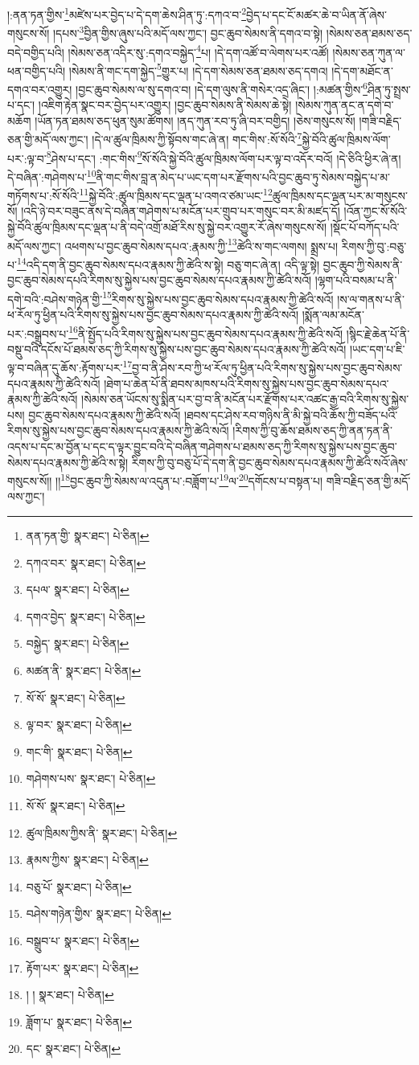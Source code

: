 །:ནན་ཏན་གྱིས་\footnote{ནན་ཏན་གྱི་  སྣར་ཐང་།  པེ་ཅིན། }མཛེས་པར་བྱེད་པ་དེ་དག་ཆེས་ཤིན་ཏུ་:དཀའ་བ་\footnote{དཀའ་བར་  སྣར་ཐང་།  པེ་ཅིན། }བྱེད་པ་དང་ངོ་མཚར་ཆེ་བ་ཡིན་ནོ་ཞེས་གསུངས་སོ། །དཔས་\footnote{དཔལ་  སྣར་ཐང་།  པེ་ཅིན། }བྱིན་གྱིས་ཞུས་པའི་མདོ་ལས་ཀྱང་། བྱང་ཆུབ་སེམས་ནི་དགའ་བ་སྟེ། །སེམས་ཅན་ཐམས་ཅད་བདེ་བགྱིད་པའི། །སེམས་ཅན་འདིར་སུ་:དགའ་བསྐྱེད་\footnote{དགའ་བྱེད་  སྣར་ཐང་།  པེ་ཅིན། }པ། །དེ་དག་འཚོ་བ་ལེགས་པར་འཚོ། །སེམས་ཅན་ཀུན་ལ་ཕན་བགྱིད་པའི། །སེམས་ནི་གང་དག་སྐྱེད་\footnote{བསྐྱེད་  སྣར་ཐང་།  པེ་ཅིན། }གྱུར་པ། །དེ་དག་སེམས་ཅན་ཐམས་ཅད་དགའ། །དེ་དག་མཐོང་ན་དགའ་བར་འགྱུར། །བྱང་ཆུབ་སེམས་ལ་སུ་དགའ་བ། །དེ་དག་ལུས་ནི་གསེར་འདྲ་ཞིང་། །:མཚན་གྱིས་\footnote{མཚན་ནི་  སྣར་ཐང་།  པེ་ཅིན། }ཤིན་ཏུ་སྤྲས་པ་དང་། །འཇིག་རྟེན་སྣང་བར་བྱེད་པར་འགྱུར། །བྱང་ཆུབ་སེམས་ནི་སེམས་ཆེ་སྟེ། །སེམས་ཀུན་ནང་ན་དགེ་བ་མཆོག །ཡོན་ཏན་ཐམས་ཅད་ཕུན་སུམ་ཚོགས། །ནད་ཀུན་རབ་ཏུ་ཞི་བར་བགྱིད། །ཅེས་གསུངས་སོ། །གཟི་བརྗིད་ཅན་གྱི་མདོ་ལས་ཀྱང་། །དེ་ལ་ཚུལ་ཁྲིམས་ཀྱི་སྟོབས་གང་ཞེ་ན། གང་གིས་:སོ་སོའི་\footnote{སོ་སོ་  སྣར་ཐང་།  པེ་ཅིན། }སྐྱེ་བོའི་ཚུལ་ཁྲིམས་ལོག་པར་:ལྟ་བ་\footnote{ལྟ་བར་  སྣར་ཐང་།  པེ་ཅིན། }ཤེས་པ་དང་། :གང་གིས་\footnote{གང་གི་  སྣར་ཐང་།  པེ་ཅིན། }སོ་སོའི་སྐྱེ་བོའི་ཚུལ་ཁྲིམས་ལོག་པར་ལྟ་བ་འདོར་བའོ། །དེ་ཅིའི་ཕྱིར་ཞེ་ན། དེ་བཞིན་:གཤེགས་པ་\footnote{གཤེགས་པས་  སྣར་ཐང་།  པེ་ཅིན། }ནི་གང་གིས་བླ་ན་མེད་པ་ཡང་དག་པར་རྫོགས་པའི་བྱང་ཆུབ་ཏུ་སེམས་བསྐྱེད་པ་མ་གཏོགས་པ་:སོ་སོའི་\footnote{སོ་སོ་  སྣར་ཐང་།  པེ་ཅིན། }སྐྱེ་བོའི་:ཚུལ་ཁྲིམས་དང་ལྡན་པ་འགའ་ཙམ་ཡང་\footnote{ཚུལ་ཁྲིམས་ཀྱིས་ནི་  སྣར་ཐང་།  པེ་ཅིན། }ཚུལ་ཁྲིམས་དང་ལྡན་པར་མ་གསུངས་སོ། །འདི་ཉེ་བར་བཟུང་ནས་དེ་བཞིན་གཤེགས་པ་མངོན་པར་གྲུབ་པར་གསུང་བར་མི་མཛད་དོ། །འོན་ཀྱང་སོ་སོའི་སྐྱེ་བོའི་ཚུལ་ཁྲིམས་དང་ལྡན་པ་ནི་བདེ་འགྲོ་མཐོ་རིས་སུ་སྐྱེ་བར་འགྱུར་རོ་ཞེས་གསུངས་སོ། །སྡོང་པོ་བཀོད་པའི་མདོ་ལས་ཀྱང་། འཕགས་པ་བྱང་ཆུབ་སེམས་དཔའ་:རྣམས་ཀྱི་\footnote{རྣམས་ཀྱིས་  སྣར་ཐང་།  པེ་ཅིན། }ཚེའི་ས་གང་ལགས། སྨྲས་པ། རིགས་ཀྱི་བུ་:བཅུ་པ་\footnote{བཅུ་པོ་  སྣར་ཐང་།  པེ་ཅིན། }འདི་དག་ནི་བྱང་ཆུབ་སེམས་དཔའ་རྣམས་ཀྱི་ཚེའི་ས་སྟེ། བཅུ་གང་ཞེ་ན། འདི་ལྟ་སྟེ། བྱང་ཆུབ་ཀྱི་སེམས་ནི་བྱང་ཆུབ་སེམས་དཔའི་རིགས་སུ་སྐྱེས་པས་བྱང་ཆུབ་སེམས་དཔའ་རྣམས་ཀྱི་ཚེའི་སའོ། །ལྷག་པའི་བསམ་པ་ནི་དགེ་བའི་:བཤེས་གཉེན་གྱི་\footnote{བཤེས་གཉེན་གྱིས་  སྣར་ཐང་།  པེ་ཅིན། }རིགས་སུ་སྐྱེས་པས་བྱང་ཆུབ་སེམས་དཔའ་རྣམས་ཀྱི་ཚེའི་སའོ། །ས་ལ་གནས་པ་ནི་ཕ་རོལ་ཏུ་ཕྱིན་པའི་རིགས་སུ་སྐྱེས་པས་བྱང་ཆུབ་སེམས་དཔའ་རྣམས་ཀྱི་ཚེའི་སའོ། །སྨོན་ལམ་མངོན་པར་:བསྒྲུབས་པ་\footnote{བསྒྲུབ་པ་  སྣར་ཐང་།  པེ་ཅིན། }ནི་སྤྱོད་པའི་རིགས་སུ་སྐྱེས་པས་བྱང་ཆུབ་སེམས་དཔའ་རྣམས་ཀྱི་ཚེའི་སའོ། །སྙིང་རྗེ་ཆེན་པོ་ནི་བསྡུ་བའི་དངོས་པོ་ཐམས་ཅད་ཀྱི་རིགས་སུ་སྐྱེས་པས་བྱང་ཆུབ་སེམས་དཔའ་རྣམས་ཀྱི་ཚེའི་སའོ། །ཡང་དག་པ་ཇི་ལྟ་བ་བཞིན་དུ་ཆོས་:རྟོགས་པར་\footnote{རྟོག་པར་  སྣར་ཐང་།  པེ་ཅིན། }བྱ་བ་ནི་ཤེས་རབ་ཀྱི་ཕ་རོལ་ཏུ་ཕྱིན་པའི་རིགས་སུ་སྐྱེས་པས་བྱང་ཆུབ་སེམས་དཔའ་རྣམས་ཀྱི་ཚེའི་སའོ། །ཐེག་པ་ཆེན་པོ་ནི་ཐབས་མཁས་པའི་རིགས་སུ་སྐྱེས་པས་བྱང་ཆུབ་སེམས་དཔའ་རྣམས་ཀྱི་ཚེའི་སའོ། །སེམས་ཅན་ཡོངས་སུ་སྨིན་པར་བྱ་བ་ནི་མངོན་པར་རྫོགས་པར་འཚང་རྒྱ་བའི་རིགས་སུ་སྐྱེས་པས། བྱང་ཆུབ་སེམས་དཔའ་རྣམས་ཀྱི་ཚེའི་སའོ། །ཐབས་དང་ཤེས་རབ་གཉིས་ནི་མི་སྐྱེ་བའི་ཆོས་ཀྱི་བཟོད་པའི་རིགས་སུ་སྐྱེས་པས་བྱང་ཆུབ་སེམས་དཔའ་རྣམས་ཀྱི་ཚེའི་སའོ། །རིགས་ཀྱི་བུ་ཆོས་ཐམས་ཅད་ཀྱི་ནན་ཏན་ནི་འདས་པ་དང་མ་བྱོན་པ་དང་ད་ལྟར་བྱུང་བའི་དེ་བཞིན་གཤེགས་པ་ཐམས་ཅད་ཀྱི་རིགས་སུ་སྐྱེས་པས་བྱང་ཆུབ་སེམས་དཔའ་རྣམས་ཀྱི་ཚེའི་ས་སྟེ། རིགས་ཀྱི་བུ་བཅུ་པོ་དེ་དག་ནི་བྱང་ཆུབ་སེམས་དཔའ་རྣམས་ཀྱི་ཚེའི་སའོ་ཞེས་གསུངས་སོ།། །།\footnote{། །  སྣར་ཐང་།  པེ་ཅིན། }བྱང་ཆུབ་ཀྱི་སེམས་ལ་འདུན་པ་:བཟློག་པ་\footnote{ཟློག་པ་  སྣར་ཐང་།  པེ་ཅིན། }ལ་\footnote{དང་  སྣར་ཐང་།  པེ་ཅིན། }དགོངས་པ་བསྟན་པ། གཟི་བརྗིད་ཅན་གྱི་མདོ་ལས་ཀྱང་། 